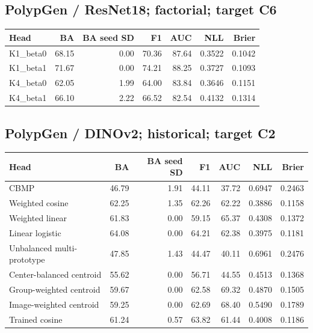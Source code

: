 \subsection*{PolypGen / ResNet18; factorial; target C6}
\begingroup\small\setlength{\tabcolsep}{3pt}
\begin{longtable}{lrrrrrr}
\toprule Head & BA & BA seed SD & F1 & AUC & NLL & Brier \\
\midrule
K1\_beta0 & 68.15 & 0.00 & 70.36 & 87.64 & 0.3522 & 0.1042 \\
K1\_beta1 & 71.67 & 0.00 & 74.21 & 88.25 & 0.3727 & 0.1093 \\
K4\_beta0 & 62.05 & 1.99 & 64.00 & 83.84 & 0.3646 & 0.1151 \\
K4\_beta1 & 66.10 & 2.22 & 66.52 & 82.54 & 0.4132 & 0.1314 \\
\bottomrule
\end{longtable}
\endgroup
\subsection*{PolypGen / DINOv2; historical; target C2}
\begingroup\small\setlength{\tabcolsep}{3pt}
\begin{longtable}{lrrrrrr}
\toprule Head & BA & BA seed SD & F1 & AUC & NLL & Brier \\
\midrule
CBMP & 46.79 & 1.91 & 44.11 & 37.72 & 0.6947 & 0.2463 \\
Weighted cosine & 62.25 & 1.35 & 62.26 & 62.22 & 0.3886 & 0.1158 \\
Weighted linear & 61.83 & 0.00 & 59.15 & 65.37 & 0.4308 & 0.1372 \\
Linear logistic & 64.08 & 0.00 & 64.21 & 62.38 & 0.3975 & 0.1181 \\
Unbalanced multi-prototype & 47.85 & 1.43 & 44.47 & 40.11 & 0.6961 & 0.2476 \\
Center-balanced centroid & 55.62 & 0.00 & 56.71 & 44.55 & 0.4513 & 0.1368 \\
Group-weighted centroid & 59.67 & 0.00 & 62.58 & 69.32 & 0.4870 & 0.1505 \\
Image-weighted centroid & 59.25 & 0.00 & 62.69 & 68.40 & 0.5490 & 0.1789 \\
Trained cosine & 61.24 & 0.57 & 63.82 & 61.44 & 0.4008 & 0.1186 \\
\bottomrule
\end{longtable}
\endgroup
